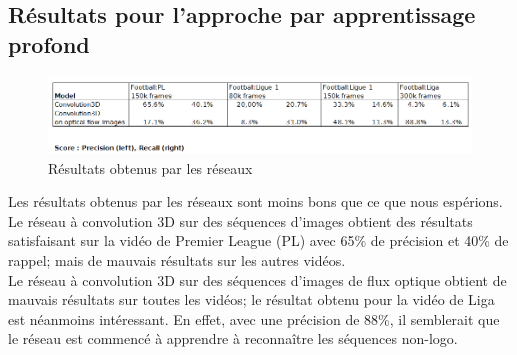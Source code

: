 \documentclass[11pt]{article}
\begin{document}
\newpage
\subsection{Résultats pour l'approche par apprentissage profond}
\label{sec:org208f091}
\begin{figure}[htbp]
\centering
\includegraphics[width=15cm]{res_conv.png}
\caption{Résultats obtenus par les réseaux}
\end{figure}
Les résultats obtenus par les réseaux sont moins bons que ce que nous espérions.\\
Le réseau à convolution 3D sur des séquences d'images obtient des résultats satisfaisant sur la vidéo de Premier League (PL) avec 65\% de précision et 40\% de rappel; mais de mauvais résultats sur les autres vidéos.\\
Le réseau à convolution 3D sur des séquences d'images de flux optique obtient de mauvais résultats sur toutes les vidéos; le résultat obtenu pour la vidéo de Liga est néanmoins intéressant. En effet, avec une précision de 88\%, il semblerait que le réseau est commencé à apprendre à reconnaître les séquences non-logo.\\
\end{document}
